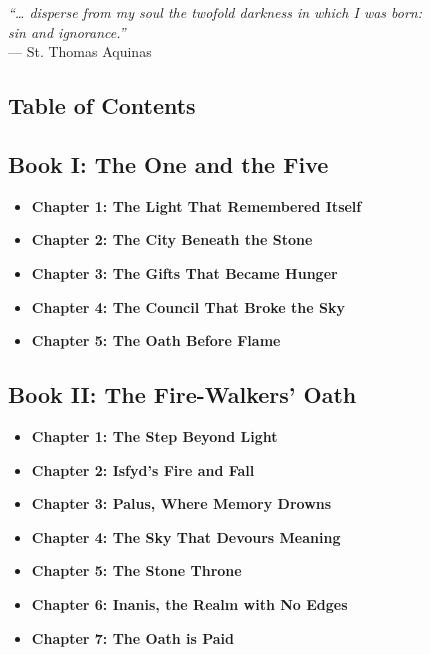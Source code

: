 \documentclass[12pt]{article}
\begin{document}
\newpage

\begin{titlepage}
\vspace*{\fill}
\begin{center}
\emph{“… disperse from my soul the twofold darkness in which I was born:} \\
\emph{sin and ignorance.”} \\
\vspace{1em}
— St. Thomas Aquinas
\end{center}
\vspace*{\fill}
\end{titlepage}


\newpage

\begin{titlepage}
\section*{Table of Contents}

\vspace{.5in}

\subsection*{Book I: The One and the Five }
\begin{itemize}
  \item \textbf{Chapter 1: The Light That Remembered Itself }
  \item \textbf{Chapter 2: The City Beneath the Stone }
  \item \textbf{Chapter 3: The Gifts That Became Hunger }
  \item \textbf{Chapter 4: The Council That Broke the Sky }
  \item \textbf{Chapter 5: The Oath Before Flame }
\end{itemize}

\vspace{.5in}

\subsection*{Book II: The Fire-Walkers’ Oath }
\begin{itemize}
  \item \textbf{Chapter 1: The Step Beyond Light }
  \item \textbf{Chapter 2: Isfyd’s Fire and Fall }
  \item \textbf{Chapter 3: Palus, Where Memory Drowns }
  \item \textbf{Chapter 4: The Sky That Devours Meaning }
  \item \textbf{Chapter 5: The Stone Throne }
  \item \textbf{Chapter 6: Inanis, the Realm with No Edges }
  \item \textbf{Chapter 7: The Oath is Paid }
\end{itemize}
\end{titlepage}
\end{document}
